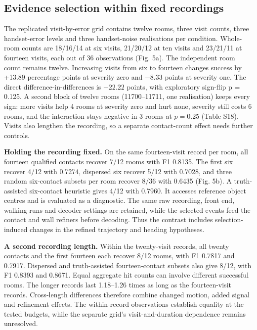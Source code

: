 \documentclass[10pt,twocolumn,letterpaper]{article}
\begin{document}
\subsection{Evidence selection within fixed
recordings}\label{evidence-selection-within-fixed-recordings}

The replicated visit-by-error grid contains twelve rooms, three visit
counts, three handset-error levels and three handset-noise realisations
per condition. Whole-room counts are 18/16/14 at six visits, 21/20/12 at
ten visits and 23/21/11 at fourteen visits, each out of 36 observations
(Fig. 5a). The independent room count remains twelve. Increasing visits
from six to fourteen changes success by +13.89 percentage points at
severity zero and $-8.33$ points at severity one. The direct
difference-in-differences is $-22.22$ points, with exploratory
sign-flip p = 0.125. A second block of twelve rooms (11700--11711, one
realisation) keeps every sign: more visits help 4 rooms at severity zero
and hurt none, severity still costs 6 rooms, and the interaction stays
negative in 3 rooms at $p=0.25$ (Table S18). Visits also lengthen the
recording, so a separate contact-count effect needs further controls.

\textbf{Holding the recording fixed.} On the same fourteen-visit record
per room, all fourteen qualified contacts recover 7/12 rooms with F1
0.8135. The first six recover 4/12 with 0.7274, dispersed six recover
5/12 with 0.7028, and three random six-contact subsets per room recover
8/36 with 0.6435 (Fig. 5b). A truth-assisted six-contact heuristic gives
4/12 with 0.7960. It accesses reference object centres and is evaluated
as a diagnostic. The same raw recording, front end, walking runs and
decoder settings are retained, while the selected events feed the
contact and wall refiners before decoding. Thus the contrast includes
selection-induced changes in the refined trajectory and heading
hypotheses.

\textbf{A second recording length.} Within the twenty-visit records, all
twenty contacts and the first fourteen each recover 8/12 rooms, with F1
0.7817 and 0.7917. Dispersed and truth-assisted fourteen-contact subsets
also give 8/12, with F1 0.8393 and 0.8671. Equal aggregate hit counts
can involve different successful rooms. The longer records last
1.18--1.26 times as long as the fourteen-visit records. Cross-length
differences therefore combine changed motion, added signal and
refinement effects. The within-record observations establish equality at
the tested budgets, while the separate grid's visit-and-duration
dependence remains unresolved.
\end{document}
